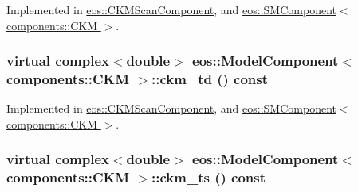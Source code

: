Implemented in \hyperlink{classeos_1_1CKMScanComponent_af171390d63478b601257163ce568f819}{eos::CKMScanComponent}, and \hyperlink{classeos_1_1SMComponent_3_01components_1_1CKM_01_4_afb95652fde6ce0bdd7a3b67db4b4ecf4}{eos::SMComponent$<$ components::CKM $>$}.\hypertarget{classeos_1_1ModelComponent_3_01components_1_1CKM_01_4_a4bcd2be1cd84c0b6ea86ded723477094}{
\subsubsection[{ckm\_\-td}]{\setlength{\rightskip}{0pt plus 5cm}virtual complex$<$double$>$ eos::ModelComponent$<$ components::CKM $>$::ckm\_\-td () const}}
\label{classeos_1_1ModelComponent_3_01components_1_1CKM_01_4_a4bcd2be1cd84c0b6ea86ded723477094}


Implemented in \hyperlink{classeos_1_1CKMScanComponent_aeb3351313d4c06d21f5d70431b835c5e}{eos::CKMScanComponent}, and \hyperlink{classeos_1_1SMComponent_3_01components_1_1CKM_01_4_a5962bd89ee4206447b52dfe2d503e9fb}{eos::SMComponent$<$ components::CKM $>$}.\hypertarget{classeos_1_1ModelComponent_3_01components_1_1CKM_01_4_a94edc4a96770b9a16e078c483670ecc3}{
\subsubsection[{ckm\_\-ts}]{\setlength{\rightskip}{0pt plus 5cm}virtual complex$<$double$>$ eos::ModelComponent$<$ components::CKM $>$::ckm\_\-ts () const}}
\label{classeos_1_1ModelComponent_3_01components_1_1CKM_01_4_a94edc4a96770b9a16e078c483670ecc3}



